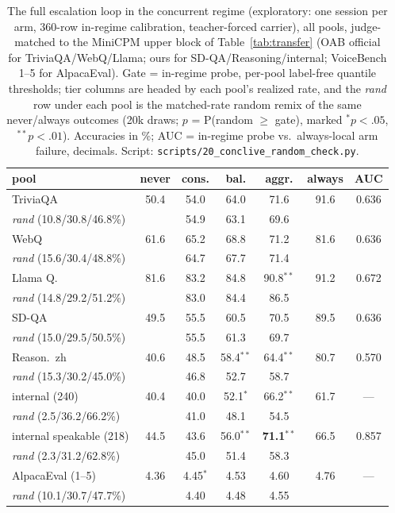 \begin{table}[h]
\centering\footnotesize
\setlength{\tabcolsep}{4pt}
\caption{The full escalation loop in the concurrent regime
(exploratory: one session per arm, 360-row in-regime
calibration, teacher-forced carrier), all pools, judge-matched to
the MiniCPM upper block of Table~\ref{tab:transfer} (OAB official for TriviaQA/WebQ/Llama; ours
for SD-QA/Reasoning/internal; VoiceBench 1--5 for AlpacaEval). Gate =
in-regime probe, per-pool label-free quantile thresholds; tier columns
are headed by each pool's realized rate, and the \emph{rand}
row under each pool is the matched-rate random remix of the same
never/always outcomes (20k draws; $p$ = P(random $\ge$ gate), marked
$^{*}p{<}.05$, $^{**}p{<}.01$). Accuracies in \%; AUC = in-regime
probe vs.\ always-local arm failure, decimals.
Script: \texttt{scripts/20\_conclive\_random\_check.py}.}
\label{tab:conclive}
\begin{tabular}{lcccccc}
\toprule
pool & never & cons. & bal. & aggr. & always & AUC \\
\midrule
TriviaQA & 50.4 & 54.0 & 64.0 & 71.6 & 91.6 & 0.636 \\
\;\emph{rand} (10.8/30.8/46.8\%) & & 54.9 & 63.1 & 69.6 & & \\
WebQ & 61.6 & 65.2 & 68.8 & 71.2 & 81.6 & 0.636 \\
\;\emph{rand} (15.6/30.4/48.8\%) & & 64.7 & 67.7 & 71.4 & & \\
Llama Q. & 81.6 & 83.2 & 84.8 & 90.8$^{**}$ & 91.2 & 0.672 \\
\;\emph{rand} (14.8/29.2/51.2\%) & & 83.0 & 84.4 & 86.5 & & \\
SD-QA & 49.5 & 55.5 & 60.5 & 70.5 & 89.5 & 0.636 \\
\;\emph{rand} (15.0/29.5/50.5\%) & & 55.5 & 61.3 & 69.7 & & \\
Reason.\ zh & 40.6 & 48.5 & 58.4$^{**}$ & 64.4$^{**}$ & 80.7 & 0.570 \\
\;\emph{rand} (15.3/30.2/45.0\%) & & 46.8 & 52.7 & 58.7 & & \\
\midrule
internal (240) & 40.4 & 40.0 & 52.1$^{*}$ & 66.2$^{**}$ & 61.7 & --- \\
\;\emph{rand} (2.5/36.2/66.2\%) & & 41.0 & 48.1 & 54.5 & & \\
internal speakable (218) & 44.5 & 43.6 & 56.0$^{**}$ & \textbf{71.1}$^{**}$ & 66.5 & 0.857 \\
\;\emph{rand} (2.3/31.2/62.8\%) & & 45.0 & 51.4 & 58.3 & & \\
AlpacaEval (1--5) & 4.36 & 4.45$^{*}$ & 4.53 & 4.60 & 4.76 & --- \\
\;\emph{rand} (10.1/30.7/47.7\%) & & 4.40 & 4.48 & 4.55 & & \\
\bottomrule
\end{tabular}
\end{table}


